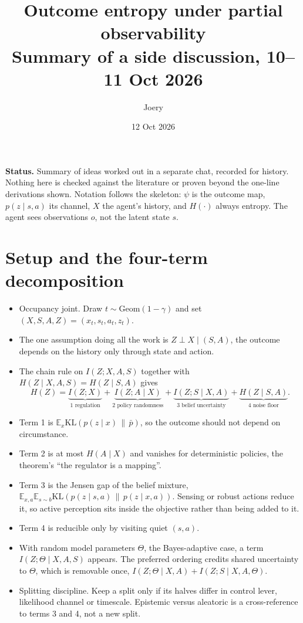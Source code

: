 \documentclass[10pt]{article}
\title{Outcome entropy under partial observability\\\large Summary of a side discussion, 10--11 Oct 2026}
\author{Joery}
\date{12 Oct 2026}
\newcommand{\KL}{\mathrm{KL}}
\newcommand{\E}{\mathbb E}
\begin{document}
\maketitle

\noindent\textbf{Status.}
Summary of ideas worked out in a separate chat, recorded for history.
Nothing here is checked against the literature or proven beyond the one-line derivations shown.
Notation follows the skeleton: $\psi$ is the outcome map, $p(z \mid s,a)$ its channel, $X$ the agent's history, and $H(\cdot)$ always entropy.
The agent sees observations $o$, not the latent state $s$.

\section{Setup and the four-term decomposition}
\begin{itemize}
  \item Occupancy joint. Draw $t \sim \mathrm{Geom}(1-\gamma)$ and set $(X,S,A,Z) = (x_t,s_t,a_t,z_t)$.
  \item The one assumption doing all the work is $Z \perp X \mid (S,A)$, the outcome depends on the history only through state and action.
  \item The chain rule on $I(Z;X,A,S)$ together with $H(Z \mid X,A,S) = H(Z \mid S,A)$ gives
  \begin{equation*}
    H(Z) = \underbrace{I(Z;X)}_{\text{1 regulation}} + \underbrace{I(Z;A \mid X)}_{\text{2 policy randomness}} + \underbrace{I(Z;S \mid X,A)}_{\text{3 belief uncertainty}} + \underbrace{H(Z \mid S,A)}_{\text{4 noise floor}}.
  \end{equation*}
  \item Term 1 is $\E_x \KL(p(z \mid x) \,\|\, \bar p)$, so the outcome should not depend on circumstance.
  \item Term 2 is at most $H(A \mid X)$ and vanishes for deterministic policies, the theorem's ``the regulator is a mapping''.
  \item Term 3 is the Jensen gap of the belief mixture, $\E_{x,a}\E_{s \sim b}\KL(p(z \mid s,a) \,\|\, p(z \mid x,a))$.
    Sensing or robust actions reduce it, so active perception sits inside the objective rather than being added to it.
  \item Term 4 is reducible only by visiting quiet $(s,a)$.
  \item With random model parameters $\Theta$, the Bayes-adaptive case, a term $I(Z;\Theta \mid X,A,S)$ appears.
    The preferred ordering credits shared uncertainty to $\Theta$, which is removable once, $I(Z;\Theta \mid X,A) + I(Z;S \mid X,A,\Theta)$.
  \item Splitting discipline.
    Keep a split only if its halves differ in control lever, likelihood channel or timescale.
    Epistemic versus aleatoric is a cross-reference to terms 3 and 4, not a new split.
\end{itemize}
\end{document}
